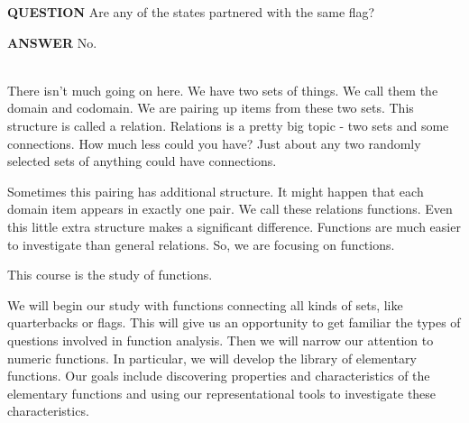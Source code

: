 \documentclass{ximera}
\begin{document}
\begin{dialogue}
\item [\textbf{QUESTION}] Are any of the states partnered with the same flag?
\item [\textbf{ANSWER}]    No.
\end{dialogue}



\quad \\



There isn't much going on here. We have two sets of things. We call them the domain and codomain. We are pairing up items from these two sets. This structure is called a relation. Relations is a pretty big topic - two sets and some connections. How much less could you have? Just about any two randomly selected sets of anything could have connections.

Sometimes this pairing has additional structure. It might happen that each domain item appears in exactly one pair. We call these relations functions.  Even this little extra structure makes a significant difference. Functions are much easier to investigate than general relations. So, we are focusing on functions.

This course is the study of functions. 

We will begin our study with functions connecting all kinds of sets, like quarterbacks or flags.  This will give us an opportunity to get familiar the types of questions involved in function analysis. Then we will narrow our attention to numeric functions. In particular, we will develop the library of elementary functions. Our goals include discovering properties and characteristics of the elementary functions and using our representational tools to investigate these characteristics.

\quad \\
\end{document}
